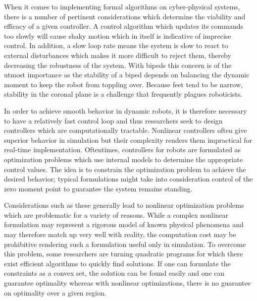 When it comes to implementing formal algorithms on cyber-physical systems, there
is a number of pertinent considerations which determine the viability and
efficacy of a given controller.
%
A control algorithm which updates its commands too slowly will cause shaky
motion which in itself is indicative of imprecise control.
%
In addition, a slow loop rate means the system is slow to react to external
disturbances which makes it more difficult to reject them, thereby decreasing
the robustness of the system.
%
With bipeds this concern is of the utmost importance as the stability of a biped
depends on balancing the dynamic moment to keep the robot from toppling over.
%
Because feet tend to be narrow, stability in the coronal plane is a challenge
that frequently plagues roboticists.


In order to achieve smooth behavior in dynamic robots, it is therefore necessary
to have a relatively fast control loop and thus researchers seek to design
controllers which are computationally tractable.
%
Nonlinear controllers often give superior behavior in simulation but
their complexity renders them impractical for real-time implementation.
%
Oftentimes, controllers for robots are formulated as optimization problems which
use internal models to determine the appropriate control values.
%
The idea is to constrain the optimization problem to achieve the desired
behavior; typical formulations might take into consideration control of the zero
moment point to guarantee the system remains standing.


Considerations such as these generally lead to nonlinear optimization problems
which are problematic for a variety of reasons.
%
While a complex nonlinear formulation may represent a rigorous model of known
physical phenomena and may therefore match up very well with reality, the
computation cost may be prohibitive rendering such a formulation useful only in
simulation.
%
To overcome this problem, some researchers are turning quadratic programs for
which there exist efficient algorithms to quickly find solutions.
%
If one can formulate the constraints as a convex set, the solution can be found
easily and one can guarantee optimality whereas with nonlinear optimizations,
there is no guarantee on optimality over a given region.


